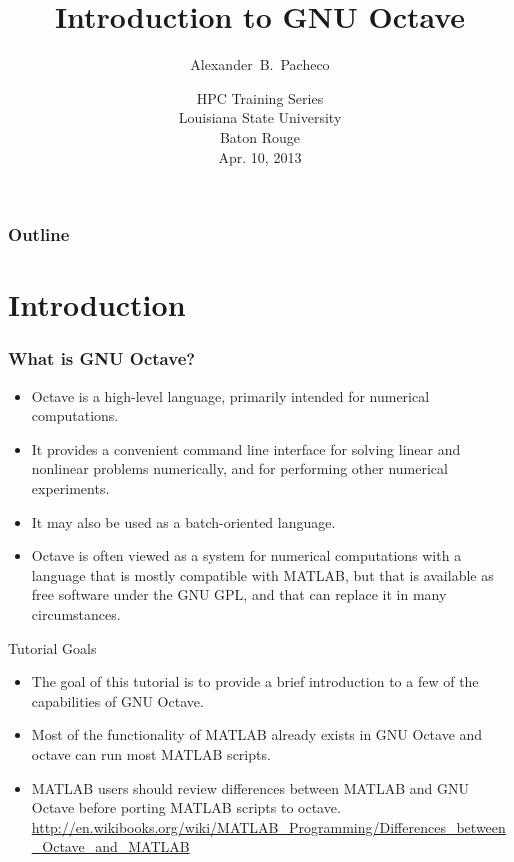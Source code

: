 \documentclass[t,compress,xcolor=svgnames]{beamer}
\title[GNU Octave]{Introduction to GNU Octave}
\author[Alex Pacheco]{\large{Alexander~B.~Pacheco}}
\institute[HPC@LSU - http://www.hpc.lsu.edu] {\inst{}\footnotesize{User Services Consultant\\LSU HPC \& LONI\\sys-help@loni.org}}
\date[{Apr. 10, 2013\hspace{2cm}}]{\scriptsize{HPC Training Series\\Louisiana State University\\Baton Rouge\\Apr. 10, 2013}}
\newenvironment{eblock}[0]
{
\begin{beamerboxesrounded}[upper=uppercol2,lower=lowercol2,shadow=true]}
{\end{beamerboxesrounded}}
\begin{document}
\scriptsize

\frame{\titlepage}

\begin{frame}[label=toc,squeeze]
  \footnotesize
  \frametitle{\small{Outline}}
  \tableofcontents
\end{frame}

\section{Introduction}
\begin{frame}
  \frametitle{\small What is GNU Octave?}
  \begin{itemize}
    \item Octave is a high-level language, primarily intended for numerical computations. 
    \item It provides a convenient command line interface for solving linear and nonlinear problems numerically, and for performing other numerical experiments. 
      \item It may also be used as a batch-oriented language.
      \item Octave is often viewed as a system for numerical computations with a language that is mostly compatible with MATLAB, but that is available as free software under the GNU GPL, and that can replace it in many circumstances.
  \end{itemize}

  \begin{eblock}{Tutorial Goals}
    \begin{itemize}
      \item The goal of this tutorial is to provide a brief introduction to a few of the capabilities of GNU Octave.
      \item Most of the functionality of MATLAB already exists in GNU Octave and octave can run most MATLAB scripts.
      \item MATLAB users should review differences between MATLAB and GNU Octave before porting MATLAB scripts to octave. \url{http://en.wikibooks.org/wiki/MATLAB_Programming/Differences_between_Octave_and_MATLAB}
    \end{itemize}
  \end{eblock}
\end{frame}
\end{document}
